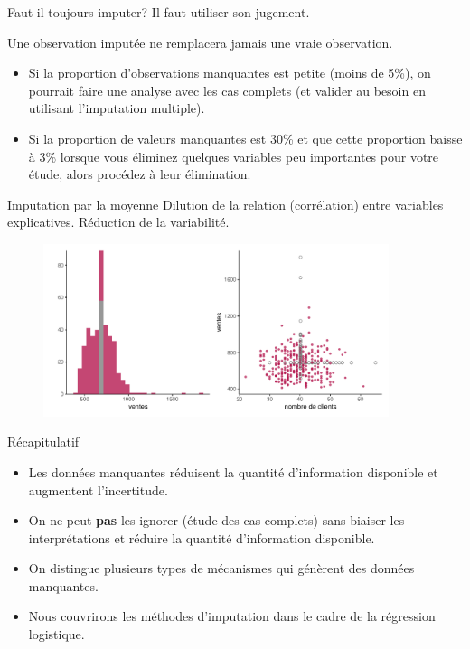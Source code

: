 \documentclass[
  ignorenonframetext,
]{beamer}
\providecommand{\tightlist}{%
  \setlength{\itemsep}{0pt}\setlength{\parskip}{0pt}}\usepackage{longtable,booktabs,array}
\begin{document}
\begin{frame}{Faut-il toujours imputer?}
\protect\hypertarget{faut-il-toujours-imputer}{}
Il faut utiliser son jugement.

Une observation imputée ne remplacera jamais une vraie observation.

\begin{itemize}
\tightlist
\item
  Si la proportion d'observations manquantes est petite (moins de 5\%),
  on pourrait faire une analyse avec les cas complets (et valider au
  besoin en utilisant l'imputation multiple).
\item
  Si la proportion de valeurs manquantes est 30\% et que cette
  proportion baisse à 3\% lorsque vous éliminez quelques variables peu
  importantes pour votre étude, alors procédez à leur élimination.
\end{itemize}
\end{frame}

\begin{frame}{Imputation par la moyenne}
\protect\hypertarget{imputation-par-la-moyenne}{}
Dilution de la relation (corrélation) entre variables explicatives.
Réduction de la variabilité.

\begin{figure}

{\centering \includegraphics[width=0.9\textwidth,height=\textheight]{MATH60602-diapos1_files/figure-beamer/unnamed-chunk-16-1.pdf}

}

\end{figure}
\end{frame}

\begin{frame}{Récapitulatif}
\protect\hypertarget{ruxe9capitulatif}{}
\begin{itemize}
\tightlist
\item
  Les données manquantes réduisent la quantité d'information disponible
  et augmentent l'incertitude.
\item
  On ne peut \textbf{pas} les ignorer (étude des cas complets) sans
  biaiser les interprétations et réduire la quantité d'information
  disponible.
\item
  On distingue plusieurs types de mécanismes qui génèrent des données
  manquantes.
\item
  Nous couvrirons les méthodes d'imputation dans le cadre de la
  régression logistique.
\end{itemize}
\end{frame}
\end{document}
